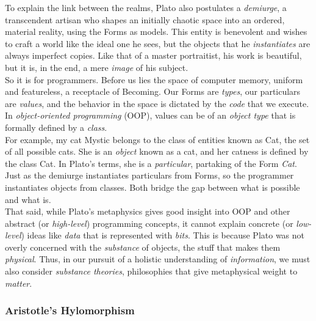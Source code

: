 To explain the link between the realms, Plato also postulates a \textit{demiurge}, a transcendent artisan who shapes an initially chaotic space into an ordered, material reality, using the Forms as models. This entity is benevolent and wishes to craft a world like the ideal one he sees, but the objects that he \textit{instantiates} are always imperfect copies. Like that of a master portraitist, his work is beautiful, but it is, in the end, a mere \textit{image} of his subject. \\

So it is for programmers. Before us lies the space of computer memory, uniform and featureless, a receptacle of Becoming. Our Forms are \textit{types}, our particulars are \textit{values}, and the behavior in the space is dictated by the \textit{code} that we execute. In \textit{object-oriented programming} (OOP), values can be of an \textit{object type} that is formally defined by a \textit{class}. \\

For example, my cat Mystic belongs to the class of entities known as Cat, the set of all possible cats. She is an \textit{object} known as a cat, and her catness is defined by the class Cat. In Plato's terms, she is a \textit{particular}, partaking of the Form \textit{Cat}. Just as the demiurge instantiates particulars from Forms, so the programmer instantiates objects from classes. Both bridge the gap between what is possible and what is. \\

That said, while Plato's metaphysics gives good insight into OOP and other abstract (or \textit{high-level}) programming concepts, it cannot explain concrete (or \textit{low-level}) ideas like \textit{data} that is represented with \textit{bits}. This is because Plato was not overly concerned with the \textit{substance} of objects, the stuff that makes them \textit{physical}. Thus, in our pursuit of a holistic understanding of \textit{information}, we must also consider \textit{substance theories}, philosophies that give metaphysical weight to \textit{matter}. \\


\subsubsection{Aristotle's Hylomorphism}

